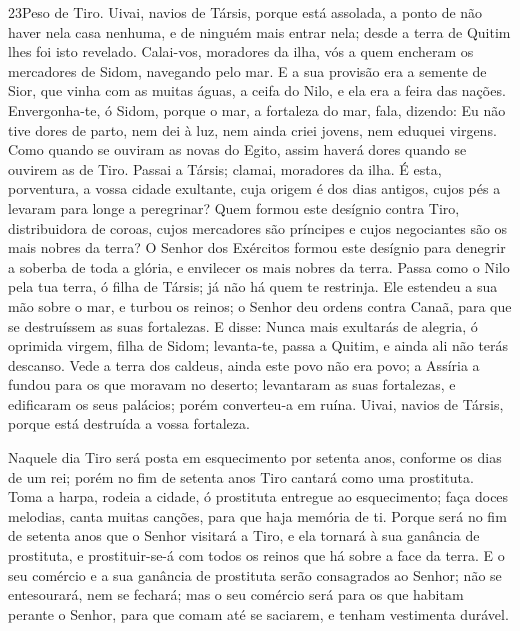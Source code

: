 \medskip

\lettrine{23}{}Peso de Tiro. Uivai, navios de Társis, porque
está assolada, a ponto de não haver nela casa nenhuma, e de ninguém
mais entrar nela; desde a terra de Quitim lhes foi isto revelado.
Calai-vos, moradores da ilha, vós a quem encheram os mercadores
de Sidom, navegando pelo mar. E a sua provisão era a semente de
Sior, que vinha com as muitas águas, a ceifa do Nilo, e ela era a
feira das nações. Envergonha-te, ó Sidom, porque o mar, a
fortaleza do mar, fala, dizendo: Eu não tive dores de parto, nem dei
à luz, nem ainda criei jovens, nem eduquei virgens. Como quando
se ouviram as novas do Egito, assim haverá dores quando se ouvirem
as de Tiro. Passai a Társis; clamai, moradores da ilha. É
esta, porventura, a vossa cidade exultante, cuja origem é dos dias
antigos, cujos pés a levaram para longe a peregrinar? Quem
formou este desígnio contra Tiro, distribuidora de coroas, cujos
mercadores são príncipes e cujos negociantes são os mais nobres da
terra? O Senhor dos Exércitos formou este desígnio para denegrir
a soberba de toda a glória, e envilecer os mais nobres da terra.
Passa como o Nilo pela tua terra, ó filha de Társis; já não
há quem te restrinja. Ele estendeu a sua mão sobre o mar, e
turbou os reinos; o Senhor deu ordens contra Canaã, para que se
destruíssem as suas fortalezas. E disse: Nunca mais exultarás
de alegria, ó oprimida virgem, filha de Sidom; levanta-te, passa a
Quitim, e ainda ali não terás descanso. Vede a terra dos
caldeus, ainda este povo não era povo; a Assíria a fundou para os
que moravam no deserto; levantaram as suas fortalezas, e edificaram
os seus palácios; porém converteu-a em ruína. Uivai, navios
de Társis, porque está destruída a vossa fortaleza.

Naquele dia Tiro será posta em esquecimento por setenta anos,
conforme os dias de um rei; porém no fim de setenta anos Tiro
cantará como uma prostituta. Toma a harpa, rodeia a cidade, ó
prostituta entregue ao esquecimento; faça doces melodias, canta
muitas canções, para que haja memória de ti. Porque será no
fim de setenta anos que o Senhor visitará a Tiro, e ela tornará à
sua ganância de prostituta, e prostituir-se-á com todos os reinos
que há sobre a face da terra. E o seu comércio e a sua
ganância de prostituta serão consagrados ao Senhor; não se
entesourará, nem se fechará; mas o seu comércio será para os que
habitam perante o Senhor, para que comam até se saciarem, e tenham
vestimenta durável.

\medskip

